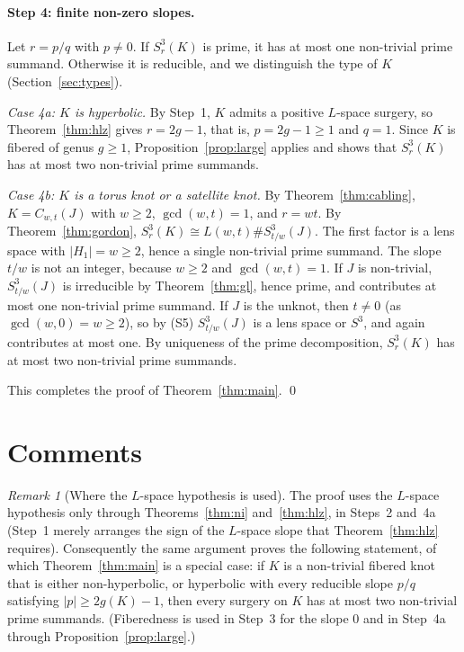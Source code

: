 \documentclass[12pt]{article}
\newcommand{\Surg}[2]{S^3_{#1}(#2)}
\theoremstyle{definition}
\theoremstyle{remark}
\newtheorem{remark}[theorem]{Remark}
\begin{document}
\paragraph{Step 4: finite non-zero slopes.}
Let \(r=p/q\) with \(p\neq0\). If \(\Surg{r}{K}\) is prime, it has at most
one non-trivial prime summand. Otherwise it is reducible, and we
distinguish the type of \(K\) (Section~\ref{sec:types}).

\emph{Case 4a: \(K\) is hyperbolic.} By Step~1, \(K\) admits a positive
\(L\)-space surgery, so Theorem~\ref{thm:hlz} gives \(r=2g-1\), that is,
\(p=2g-1\geq1\) and \(q=1\). Since \(K\) is fibered of genus \(g\geq1\),
Proposition~\ref{prop:large} applies and shows that \(\Surg{r}{K}\) has at
most two non-trivial prime summands.

\emph{Case 4b: \(K\) is a torus knot or a satellite knot.} By
Theorem~\ref{thm:cabling}, \(K=C_{w,t}(J)\) with \(w\geq2\),
\(\gcd(w,t)=1\), and \(r=wt\). By Theorem~\ref{thm:gordon},
\(\Surg{r}{K}\cong L(w,t)\#\Surg{t/w}{J}\). The first factor is a lens
space with \(|H_1|=w\geq2\), hence a single non-trivial prime summand.
The slope \(t/w\) is not an integer, because \(w\geq2\) and
\(\gcd(w,t)=1\). If \(J\) is non-trivial, \(\Surg{t/w}{J}\) is irreducible
by Theorem~\ref{thm:gl}, hence prime, and contributes at most one
non-trivial prime summand. If \(J\) is the unknot, then \(t\neq0\) (as
\(\gcd(w,0)=w\geq2\)), so by (S5) \(\Surg{t/w}{J}\) is a lens space or
\(S^3\), and again contributes at most one. By uniqueness of the prime
decomposition, \(\Surg{r}{K}\) has at most two non-trivial prime
summands.

This completes the proof of Theorem~\ref{thm:main}. \qed

\section{Comments}\label{sec:comments}

\begin{remark}[Where the \(L\)-space hypothesis is used]
The proof uses the \(L\)-space hypothesis only through
Theorems~\ref{thm:ni} and~\ref{thm:hlz}, in Steps~2 and~4a (Step~1
merely arranges the sign of the \(L\)-space slope that
Theorem~\ref{thm:hlz} requires). Consequently the same argument proves
the following statement, of which Theorem~\ref{thm:main} is a special
case: if \(K\) is a non-trivial fibered knot that is either
non-hyperbolic, or hyperbolic with every reducible slope \(p/q\)
satisfying \(|p|\geq2g(K)-1\), then every surgery on \(K\) has at most
two non-trivial prime summands. (Fiberedness is used in Step~3 for the
slope \(0\) and in Step~4a through Proposition~\ref{prop:large}.)
\end{remark}
\end{document}

